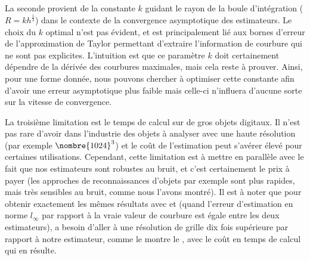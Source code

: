 

La seconde provient de la constante $k$ guidant le rayon de la boule
d'intégration ($R=kh^\frac{1}{3}$) dans le contexte de la convergence
asymptotique des estimateurs. Le choix du $k$ optimal n'est pas évident,
et est principalement lié aux bornes d'erreur de l'approximation de Taylor
permettant d'extraire l'information de courbure qui ne sont pas explicites.
L'intuition est que ce paramètre $k$ doit certainement dépendre de la dérivée
des courbures maximales, mais cela reste à prouver. Ainsi, pour une forme
donnée, nous pouvons chercher à optimiser cette constante afin d'avoir une
erreur asymptotique plus faible mais celle-ci n'influera d'aucune sorte sur la
vitesse de convergence.


La troisième limitation est le temps de calcul sur de gros objets digitaux. Il
n'est pas rare d'avoir dans l'industrie des objets à analyser avec une haute
résolution (par exemple $\nombre{1024}^3$) et le coût de l'estimation peut
s'avérer élevé pour certaines utilisations. Cependant, cette limitation
est à mettre en parallèle avec le fait que nos estimateurs sont robustes au
bruit, et c'est certainement le prix à payer (les approches de reconnaissances
d'objets par exemple sont plus rapides, mais très sensibles au bruit, comme nous
l'avons montré). Il est à noter que pour obtenir exactement les mêmes résultats avec
\BC et \II (\cad quand l'erreur d'estimation en norme $l_\infty$ par rapport à
la vraie valeur de courbure est égale entre les deux estimateurs), \BC a besoin
d'aller à une résolution de grille dix fois supérieure par rapport à notre
estimateur, comme le montre le , avec le coût en temps
de calcul qui en résulte.

